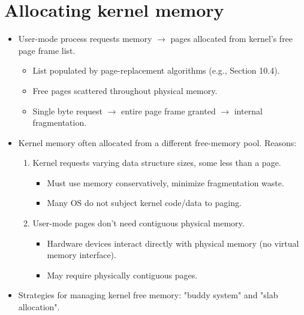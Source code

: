 \section{Allocating kernel memory}
\begin{itemize}
    \item User-mode process requests memory $\rightarrow$ pages allocated from kernel's free page frame list.
    \begin{itemize}
        \item List populated by page-replacement algorithms (e.g., Section 10.4).
        \item Free pages scattered throughout physical memory.
        \item Single byte request $\rightarrow$ entire page frame granted $\rightarrow$ internal fragmentation.
    \end{itemize}
    \item Kernel memory often allocated from a different free-memory pool. Reasons:
    \begin{enumerate}
        \item Kernel requests varying data structure sizes, some less than a page.
        \begin{itemize}
            \item Must use memory conservatively, minimize fragmentation waste.
            \item Many OS do not subject kernel code/data to paging.
        \end{itemize}
        \item User-mode pages don't need contiguous physical memory.
        \begin{itemize}
            \item Hardware devices interact directly with physical memory (no virtual memory interface).
            \item May require physically contiguous pages.
        \end{itemize}
    \end{enumerate}
    \item Strategies for managing kernel free memory: "buddy system" and "slab allocation".
\end{itemize}

